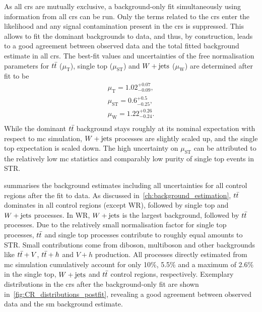 As all \glspl{cr} are mutually exclusive, a background-only fit simultaneously using information from all \glspl{cr} can be run.
Only the terms related to the \glspl{cr} enter the likelihood and any signal contamination present in the \glspl{cr} is suppressed.
This allows to fit the dominant backgrounds to data, and thus, by construction, leads to a good agreement between observed data and the total fitted background estimate in all \glspl{cr}.
The best-fit values and uncertainties of the free normalisation parameters for $t\bar{t}$ ($\mu_\mathrm{T}$), single top ($\mu_\mathrm{ST}$) and $W+\mathrm{jets}$ ($\mu_\mathrm{W}$) are determined after fit to be
\begin{equation}
	\begin{split}
		\mu_\mathrm{T} = 1.02^{+0.07}_{-0.09}, \\
		\mu_\mathrm{ST} = 0.6^{+0.5}_{-0.25}, \\
		\mu_\mathrm{W} = 1.22^{+0.26}_{-0.24}. \\
	\end{split}
\end{equation}
While the dominant $t\bar{t}$ background stays roughly at its nominal expectation with respect to \gls{mc} simulation, $W+\mathrm{jets}$ processes are slightly scaled up, and the single top expectation is scaled down.
The high uncertainty on $\mu_\mathrm{ST}$ can be attributed to the relatively low \gls{mc} statistics and comparably low purity of single top events in STR.

 summarises the background estimates including all uncertainties for all control regions after the fit to data.
As discussed in~\cref{ch:background_estimation}, $t\bar{t}$ dominates in all control regions (except WR), followed by single top and $W+\mathrm{jets}$ processes.
In WR, $W+\mathrm{jets}$ is the largest background, followed by $t\bar{t}$ processes.
Due to the relatively small normalisation factor for single top processes, $t\bar{t}$ and single top processes contribute to roughly equal amounts to STR.
Small contributions come from diboson, multiboson and other backgrounds like $t\bar{t}+V$, $t\bar{t}+h$ and $V+h$ production.
All processes directly estimated from \gls{mc} simulation cumulatively account for only 10\%, 5.5\% and a maximum of 2.6\% in the single top, $W+\mathrm{jets}$ and $t\bar{t}$ control regions, respectively.
Exemplary distributions in the \glspl{cr} after the background-only fit are shown in~\cref{fig:CR_distributions_postfit}, revealing a good agreement between observed data and the \gls{sm} background estimate.

